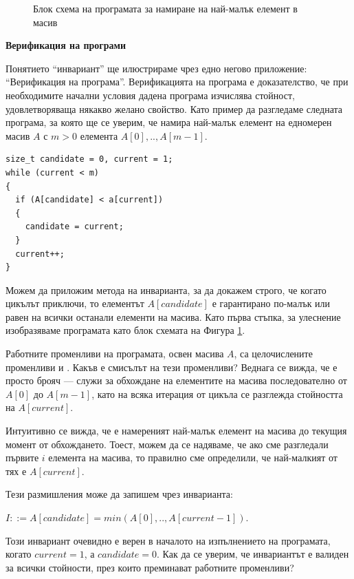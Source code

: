 {\begin{figure}

  \caption{Блок схема на програмата за намиране на най-малък елемент в масив}
  \label{fig:minel}
\end{figure}



\begin{mdframed}[hidealllines=true,backgroundcolor=gray!20]

\bigskip
\textbf{Верификация на програми}
\bigskip

Понятието ``инвариант'' ще илюстрираме чрез едно негово приложение: ``Верификация на програма''. Верификацията на програма е доказателство, че при необходимите начални условия дадена програма изчислява стойност, удовлетворяваща някакво желано свойство. Като пример да разгледаме следната  програма, за която ще се уверим, че намира най-малък елемент на едномерен масив $A$ с $m>0$ елемента $A[0],..,A[m-1]$.


\begin{verbatim}
size_t candidate = 0, current = 1;
while (current < m)
{
  if (A[candidate] < a[current])
  {
    candidate = current;
  }
  current++;
}
\end{verbatim}
Можем да приложим метода на инварианта, за да докажем строго, че когато цикълът приключи, то елементът $A[candidate]$ е гарантирано по-малък или равен на всички останали елементи на масива.
Като първа стъпка, за улеснение изобразяваме програмата като блок схемата на Фигура \ref{fig:minel}.


Работните променливи на програмата, освен масива $A$, са целочислените променливи  и . Какъв е смисълът на тези променливи? Веднага се вижда, че  е просто брояч --- служи за обхождане на елементите на масива последователно от $A[0]$ до $A[m-1]$, като на всяка итерация от цикъла се разглежда стойността на $A[current]$.

Интуитивно се вижда, че  е намереният най-малък елемент на масива до текущия момент от обхождането. Тоест, можем да се надяваме, че ако сме разгледали първите $i$ елемента на масива, то правилно сме определили, че най-малкият от тях е $A[current]$.

Тези размишления може да запишем чрез инварианта:

$I ::= A[candidate]=min(A[0],..,A[current-1])$.

Този инвариант очевидно е верен в началото на изпълнението на програмата, когато $current=1$, а $candidate=0$. Как да се уверим, че инвариантът е валиден за всички стойности, през които преминават работните променливи?


\end{mdframed}}
